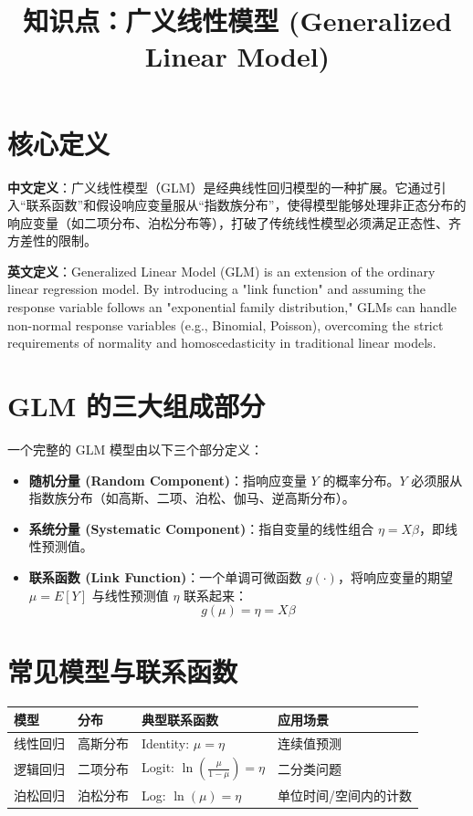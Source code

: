 \documentclass[12pt, a4paper]{article}
\title{知识点：广义线性模型 (Generalized Linear Model)}
\author{}
\date{}
\begin{document}
\maketitle

\section{核心定义}
\textbf{中文定义}：广义线性模型（GLM）是经典线性回归模型的一种扩展。它通过引入“联系函数”和假设响应变量服从“指数族分布”，使得模型能够处理非正态分布的响应变量（如二项分布、泊松分布等），打破了传统线性模型必须满足正态性、齐方差性的限制。

\textbf{英文定义}：Generalized Linear Model (GLM) is an extension of the ordinary linear regression model. By introducing a "link function" and assuming the response variable follows an "exponential family distribution," GLMs can handle non-normal response variables (e.g., Binomial, Poisson), overcoming the strict requirements of normality and homoscedasticity in traditional linear models.

\section{GLM 的三大组成部分}
一个完整的 GLM 模型由以下三个部分定义：
\begin{itemize}
    \item \textbf{随机分量 (Random Component)}：指响应变量 $Y$ 的概率分布。$Y$ 必须服从指数族分布（如高斯、二项、泊松、伽马、逆高斯分布）。
    \item \textbf{系统分量 (Systematic Component)}：指自变量的线性组合 $\eta = X\beta$，即线性预测值。
    \item \textbf{联系函数 (Link Function)}：一个单调可微函数 $g(\cdot)$，将响应变量的期望 $\mu = E[Y]$ 与线性预测值 $\eta$ 联系起来：
    $$ g(\mu) = \eta = X\beta $$
\end{itemize}

\section{常见模型与联系函数}
\begin{table}[h]
\centering
\begin{tabularx}{\textwidth}{|l|l|l|X|}
\hline
\textbf{模型} & \textbf{分布} & \textbf{典型联系函数} & \textbf{应用场景} \\
\hline
线性回归 & 高斯分布 & Identity: $\mu = \eta$ & 连续值预测 \\
\hline
逻辑回归 & 二项分布 & Logit: $\ln(\frac{\mu}{1-\mu}) = \eta$ & 二分类问题 \\
\hline
泊松回归 & 泊松分布 & Log: $\ln(\mu) = \eta$ & 单位时间/空间内的计数 \\
\hline
\end{tabularx}
\end{table}
\end{document}

